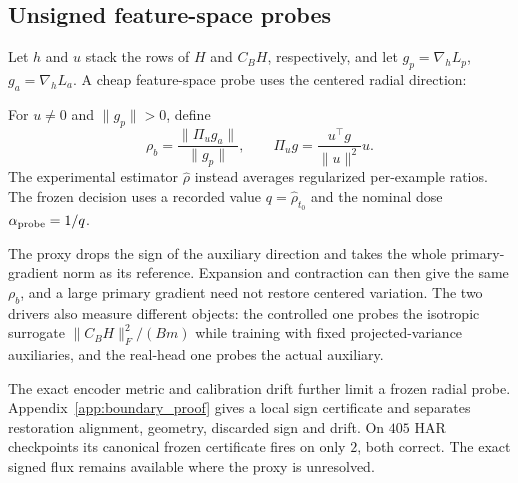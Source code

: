 \subsection{Unsigned feature-space probes}\label{app:unsigned_probe}

Let $h$ and $u$ stack the rows of $H$ and $C_BH$, respectively, and let $g_p=\nabla_h L_p$, $g_a=\nabla_h L_a$. A cheap feature-space probe uses the centered radial direction:
\begin{definition}\label{def:toxicity}
For $u\ne0$ and $\|g_p\|>0$, define
\begin{equation}
 \rho_b=\frac{\|\Pi_u g_a\|}{\|g_p\|},\qquad
 \Pi_u g=\frac{u^\top g}{\|u\|^2}u.
 \label{eq:order}
\end{equation}
The experimental estimator $\hat\rho$ instead averages regularized per-example ratios. The frozen decision uses a recorded value $q=\hat\rho_{t_0}$ and the nominal dose $\alpha_{\rm probe}=1/q$.
\end{definition}

The proxy drops the sign of the auxiliary direction and takes the whole primary-gradient norm as its reference. Expansion and contraction can then give the same $\rho_b$, and a large primary gradient need not restore centered variation. The two drivers also measure different objects: the controlled one probes the isotropic surrogate $\|C_BH\|_F^2/(Bm)$ while training with fixed projected-variance auxiliaries, and the real-head one probes the actual auxiliary.

The exact encoder metric and calibration drift further limit a frozen radial
probe. Appendix~\ref{app:boundary_proof} gives a local sign certificate and
separates restoration alignment, geometry, discarded sign and drift. On $405$
HAR checkpoints its canonical frozen certificate fires on only $2$, both
correct. The exact signed flux remains available where the proxy is unresolved.

